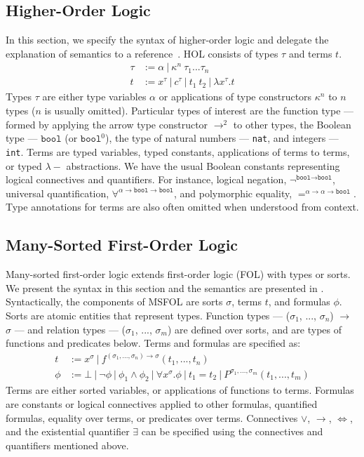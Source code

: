 \documentclass{article}
\begin{document}
	\subsection{Higher-Order Logic}
	\label{sec:hol}
	In this section, we specify the 
	syntax of higher-order logic 
	and delegate the explanation of 
	semantics to a 
	reference~\cite{10.5555/155278}. 
	HOL consists of 
	types $\tau$ and terms $t$. 
	\begin{align*}
	\tau &:= \alpha\ |\ \kappa^n\ 
	\tau_1 ... \tau_n\\
	t &:= x^{\tau}\ |\ c^{\tau}\ |\ t_1\ t_2\ 
	|\ \lambda x^{\tau}.t
	\end{align*}	
	Types $\tau$ are either type
	variables $\alpha$ or 
	applications of type 
	constructors $\kappa^n$ to 
	$n$ types ($n$ is usually omitted). 
	Particular types of interest are 
	the function type --- formed by 
	applying the arrow type constructor 
	$\to^{2}$ to other types, the 
	Boolean type --- $\texttt{bool}$ 
	(or $\texttt{bool}^0$), the type of 
	natural numbers --- \texttt{nat},
	and integers --- \texttt{int}.
	Terms are typed variables, 
	typed constants, applications 
	of terms to terms, or typed
	$\lambda-$ abstractions. We have
	the usual Boolean constants 
	representing logical connectives
	and quantifiers. For instance, 
	logical negation, 
	$\neg^{\texttt{bool} \to 
	\texttt{bool}}$, universal 
	quantification,
	$\forall^{\alpha \to 
	\texttt{bool} \to \texttt{bool}}$, 
	and polymorphic equality,
	$=^{\alpha \to \alpha 
	\to \texttt{bool}}$. Type 
	annotations for terms are also 
	often omitted when understood
	from context.

	\subsection{Many-Sorted First-Order Logic}
	\label{sec:msfol}
	Many-sorted first-order logic extends
	first-order logic (FOL) with 
	types or sorts. We present the 
	syntax in this section and the 
	semantics are presented in
	\cite{Barrett2018}. Syntactically, 
	the components of MSFOL are sorts 
	$\sigma$, terms $t$, and 
	formulas $\phi$. Sorts are 
	atomic entities that 
	represent types. Function types 
	--- ($\sigma_1$, ..., $\sigma_n$) 
	$\to$ $\sigma$ ---
	and relation types 
	--- ($\sigma_1$, ..., $\sigma_m$)
	are defined over sorts, and 
	are types of functions and 
	predicates below. Terms and 
	formulas are specified as:
	\begin{align*}
		t &:= x^{\sigma}\ |\ 
		f^{(\sigma_1, ..., \sigma_n) \to 
		\sigma}	(t_1, ..., t_n)\\
		\phi &:= \bot\ |\ \neg \phi\ |\ 
		\phi_1 \land \phi_2\ |\ \forall 
		x^{\sigma} . \phi\ |\ t_1 = t_2
		\ |\ P^{\sigma_1,...,\sigma_m}
		(t_1, ..., t_m)
	\end{align*}
	Terms are either sorted variables, 
	or applications of functions to terms.
	Formulas are constants or logical 
	connectives applied to other 
	formulas, quantified formulas, 
	equality over terms, or predicates 
	over terms. Connectives $\lor$, 
	$\to$, $\iff$, and the existential
	quantifier $\exists$ can be 
	specified using the connectives 
	and quantifiers mentioned above.
	
\end{document}

